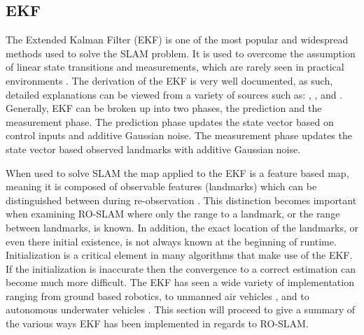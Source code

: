 \documentclass[conference]{IEEEtran}
\begin{document}
	\subsection{EKF}
	
	
	
	The Extended Kalman Filter (EKF) is one of the most popular and widespread methods used to solve the SLAM problem. It is used to overcome the assumption of linear state transitions and measurements, which are rarely seen in practical environments \cite{Thrun2002}. The derivation of the EKF is very well documented, as such, detailed explanations can be viewed from a variety of sources such as: \cite{Thrun2002}, \cite{Ribeiro2004}, and \cite{Haykin2001}. Generally, EKF can be broken up into two phases, the prediction and the measurement phase. The prediction phase updates the state vector based on control inputs and additive Gaussian noise. The measurement phase updates the state vector based observed landmarks with additive Gaussian noise.
	
	When used to solve SLAM the map applied to the EKF is a feature based map, meaning it is composed of observable features (landmarks) which can be distinguished between during re-observation \cite{Thrun2002}. This distinction becomes important when examining RO-SLAM where only the range to a landmark, or the range between landmarks, is known. 
	In addition, the exact location of the landmarks, or even there initial existence, is not always known at the beginning of runtime. Initialization is a critical element in many algorithms that make use of the EKF. If the initialization is inaccurate then the convergence to a correct estimation can become much more difficult. The EKF has seen a wide variety of implementation ranging from ground based robotics\cite{Djugash2008, Shue2017}, to unmanned air vehicles \cite{Fabresse2016}, and to autonomous underwater vehicles \cite{Olson2006}. This section will proceed to give a summary of the various ways EKF has been implemented in regards to RO-SLAM.
	
\end{document}
